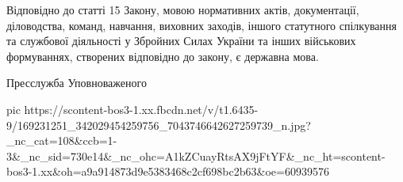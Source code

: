 Відповідно до статті 15 Закону, мовою нормативних актів, документації,
діловодства, команд, навчання, виховних заходів, іншого статутного спілкування
та службової діяльності у Збройних Силах України та інших військових
формуваннях, створених відповідно до закону, є державна мова.

Пресслужба Уповноваженого

\ifcmt
  pic https://scontent-bos3-1.xx.fbcdn.net/v/t1.6435-9/169231251_342029454259756_7043746642627259739_n.jpg?_nc_cat=108&ccb=1-3&_nc_sid=730e14&_nc_ohc=A1kZCuayRtsAX9jFtYF&_nc_ht=scontent-bos3-1.xx&oh=a9a914873d9e5383468c2cf698bc2b63&oe=60939576
\fi

